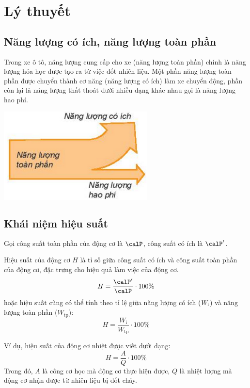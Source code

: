 \setcounter{section}{0}
\section{Lý thuyết}
\subsection{Năng lượng có ích, năng lượng toàn phần}
\begin{minipage}{0.6\textwidth}
	Trong xe ô tô, năng lượng cung cấp cho xe (năng lượng toàn phần) chính là năng lượng hóa học được tạo ra từ việc đốt nhiên liệu. Một phần năng lượng toàn phần được chuyển thành cơ năng (năng lượng có ích) làm xe chuyển động, phần còn lại là năng lượng thất thoát dưới nhiều dạng khác nhau gọi là năng lượng hao phí.
\end{minipage}
\begin{minipage}{0.4\textwidth}
	\begin{center}
		\includegraphics[scale=0.8]{../figs/G10-022-1}
	\end{center}
\end{minipage}

\subsection{Khái niệm hiệu suất}
Gọi công suất toàn phần của động cơ là $\calP$, công suất có ích là $\calP'$.

Hiệu suất của động cơ $H$ là tỉ số giữa công suất có ích và công suất toàn phần của động cơ, đặc trưng cho hiệu quả làm việc của động cơ.
$$H=\dfrac{\calP'}{\calP} \cdot 100\%$$
hoặc hiệu suất cũng có thể tính theo tỉ lệ giữa năng lượng có ích ($W_\text i$) và năng lượng toàn phần ($W_\text{tp}$):
$$H=\dfrac{W_\text{i}}{W_\text{tp}} \cdot 100\%$$

Ví dụ, hiệu suất của động cơ nhiệt được viết dưới dạng:
$$H=\dfrac{A}{Q} \cdot 100\%$$
Trong đó, $A$ là công cơ học mà động cơ thực hiện được, $Q$ là nhiệt lượng mà động cơ nhận được từ nhiên liệu bị đốt cháy.


